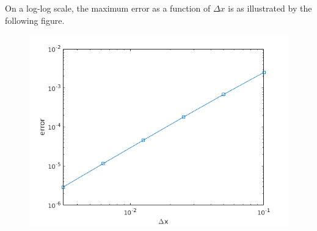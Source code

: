\begin{itemize}
  On a log-log scale,
  the maximum error as a function of $\Delta x$ is as illustrated by the following figure.
  \begin{figure}[H]
    \centering
    \includegraphics[scale=0.55]{png/herr2.png}
  \end{figure}
\end{itemize}
